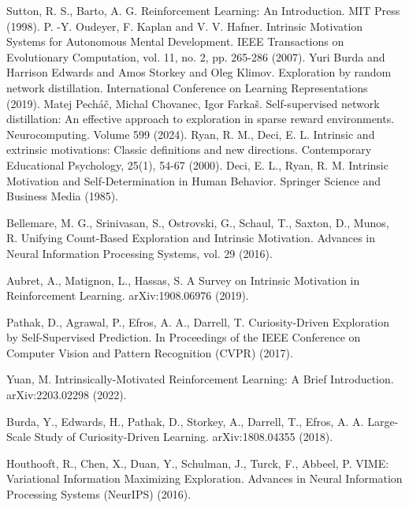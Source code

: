 \begin{thebibliography}{99}
   Sutton, R. S., Barto, A. G.
   Reinforcement Learning: An Introduction.
   MIT Press (1998).
   P. -Y. Oudeyer, F. Kaplan and V. V. Hafner.
   Intrinsic Motivation Systems for Autonomous Mental Development.
   IEEE Transactions on Evolutionary Computation, vol. 11, no. 2, pp. 265-286 (2007).
   Yuri Burda and Harrison Edwards and Amos Storkey and Oleg Klimov.
   Exploration by random network distillation.
   International Conference on Learning Representations (2019).
   Matej Pecháč, Michal Chovanec, Igor Farkaš.
   Self-supervised network distillation: An effective approach to exploration in sparse reward environments.
   Neurocomputing.
   Volume 599 (2024).
   Ryan, R. M., Deci, E. L.
   Intrinsic and extrinsic motivations: Classic definitions and new directions.
   Contemporary Educational Psychology, 25(1), 54-67 (2000).
   Deci, E. L., Ryan, R. M.
   Intrinsic Motivation and Self-Determination in Human Behavior.
   Springer Science and Business Media (1985).

   Bellemare, M. G., Srinivasan, S., Ostrovski, G., Schaul, T., Saxton, D., Munos, R.
   Unifying Count-Based Exploration and Intrinsic Motivation.
   Advances in Neural Information Processing Systems, vol. 29 (2016).

   Aubret, A., Matignon, L., Hassas, S.
   A Survey on Intrinsic Motivation in Reinforcement Learning.
   arXiv:1908.06976 (2019).

   Pathak, D., Agrawal, P., Efros, A. A., Darrell, T.
   Curiosity-Driven Exploration by Self-Supervised Prediction.
   In Proceedings of the IEEE Conference on Computer Vision and Pattern Recognition (CVPR) (2017).

   Yuan, M.
   Intrinsically-Motivated Reinforcement Learning: A Brief Introduction.
   arXiv:2203.02298 (2022).

   Burda, Y., Edwards, H., Pathak, D., Storkey, A., Darrell, T., Efros, A. A.
   Large-Scale Study of Curiosity-Driven Learning.
   arXiv:1808.04355 (2018).

   Houthooft, R., Chen, X., Duan, Y., Schulman, J., Turck, F., Abbeel, P.
   VIME: Variational Information Maximizing Exploration.
   Advances in Neural Information Processing Systems (NeurIPS) (2016).


\end{thebibliography}
